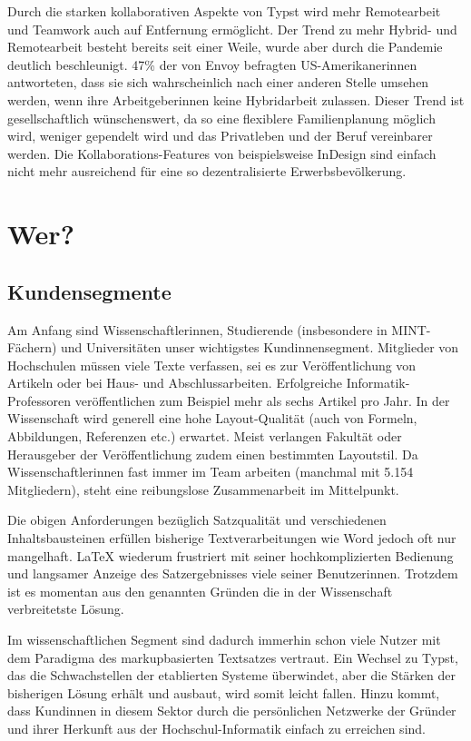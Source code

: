 \documentclass[11pt, a4paper]{article}
\newcommand{\gender}{\raisebox{-.25em}{*}}
\let\oldsection\section
\renewcommand\section{\clearpage\oldsection}
\newcommand{\cited}[1]{\marginsymbol{$\nearrow$ #1}}
\newcommand{\marginsymbol}[1] {\protect\marginsymbolhelper{#1}}
\newcommand{\marginsymbolhelper}[1] {\tabto*{-1cm}\makebox[0cm]{#1}\tabto*{\TabPrevPos}}
\begin{document}
Durch die starken kollaborativen Aspekte von Typst wird mehr Remotearbeit und Teamwork auch auf Entfernung ermöglicht. Der Trend zu mehr \cited{2} Hybrid- und Remotearbeit besteht bereits seit einer Weile, wurde aber durch die Pandemie deutlich beschleunigt. \cited{3} 47\% der von Envoy befragten US-Amerikaner\gender{}innen antworteten, dass sie sich wahrscheinlich nach einer anderen Stelle umsehen werden, wenn ihr\gender{}e Arbeitgeber\gender{}innen keine Hybridarbeit zulassen. Dieser Trend ist gesellschaftlich wünschenswert, da so eine flexiblere Familienplanung möglich wird, weniger gependelt wird und das Privatleben und der Beruf vereinbarer werden. Die Kollaborations-Features von beispielsweise InDesign sind einfach nicht mehr ausreichend für eine so dezentralisierte Erwerbsbevölkerung.

\section*{Wer?}
\subsection*{Kundensegmente}

Am Anfang sind Wissenschaftler\gender{}innen, Studierende (insbesondere in MINT-Fächern) und Universitäten unser wichtigstes Kund\gender{}innensegment. Mitglieder von Hochschulen müssen viele Texte verfassen, sei es zur Veröffentlichung von Artikeln oder bei Haus- und Abschlussarbeiten. \cited{4} Erfolgreiche Informatik-Professoren veröffentlichen zum Beispiel mehr als sechs Artikel pro Jahr. In der Wissenschaft wird generell eine hohe Layout-Qualität (auch von Formeln, Abbildungen, Referenzen etc.) erwartet. Meist verlangen Fakultät oder Herausgeber der Veröffentlichung zudem einen bestimmten Layoutstil. Da Wissenschaftler\gender{}innen fast immer im Team arbeiten (manchmal mit 5.154 Mitgliedern\cited{5}), steht eine reibungslose Zusammenarbeit im Mittelpunkt.

Die obigen Anforderungen bezüglich Satzqualität und verschiedenen Inhaltsbausteinen erfüllen bisherige Textverarbeitungen wie Word jedoch oft nur mangelhaft. LaTeX wiederum \cited{6}frustriert mit seiner hochkomplizierten Bedienung und langsamer Anzeige des Satzergebnisses viele seiner Benutzer\gender{}innen. Trotzdem ist es momentan aus den genannten Gründen die in der Wissenschaft verbreitetste Lösung.

Im wissenschaftlichen Segment sind dadurch immerhin schon viele Nutzer mit dem Paradigma des markupbasierten Textsatzes vertraut. Ein Wechsel zu Typst, das die Schwachstellen der etablierten Systeme überwindet, aber die Stärken der bisherigen Lösung erhält und ausbaut, wird somit leicht fallen. Hinzu kommt, dass Kund\gender{}innen in diesem Sektor durch die persönlichen Netzwerke der Gründer und ihrer Herkunft aus der Hochschul-Informatik einfach zu erreichen sind.
\end{document}
